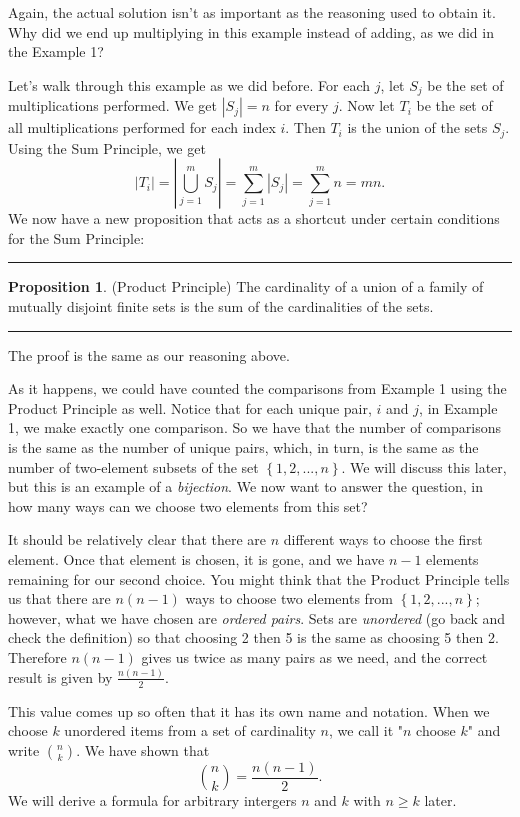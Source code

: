\documentclass[12pt, letterpaper]{article}
\theoremstyle{definition}
\newtheorem{propt}{Proposition}
\newenvironment{prop}[1]{%
    \vspace*{0.2in}
    \linebreak
    \begin{minipage}{\linewidth}
    \rule{\textwidth}{2pt}
        \begin{propt}
}
{%
        \end{propt}
    \rule{\textwidth}{2pt}
    \end{minipage}
    \vspace*{0.2in}
    \linebreak
}
\begin{document}
Again, the actual solution isn't as important as the reasoning used to obtain
it. Why did we end up multiplying in this example instead of adding, as we did
in the Example 1?

Let's walk through this example as we did before. For each $j$, let $S_{j}$
be the set of multiplications performed. We get $|S_{j}| = n$ for every $j$.
Now let $T_{i}$ be the set of all multiplications performed for each index $i$.
Then $T_{i}$ is the union of the sets $S_{j}$.
Using the Sum Principle, we get
\begin{equation*}
    |T_{i}| = \left| \bigcup_{j=1}^{m}S_{j} \right| = \sum_{j=1}^{m}|S_{j}| = \sum_{j=1}^{m}n = mn.
\end{equation*}
We now have a new proposition that acts as a shortcut under certain conditions
for the Sum Principle:
\begin{prop}
    \textbf{(Product Principle)}
    The cardinality of a union of a family of mutually disjoint finite sets is the
    sum of the cardinalities of the sets.
\end{prop}
The proof is the same as our reasoning above.

\clearpage\pagebreak
As it happens, we could have counted the comparisons from Example 1 using the
Product Principle as well. Notice that for each unique pair, $i$ and $j$, in
Example 1, we make exactly one comparison. So we have that the number of
comparisons is the same as the number of unique pairs, which, in turn, is the
same as the number of two-element subsets of the set
$\left\{ 1, 2, ..., n \right\}$. We will discuss this later, but this is an
example of a \emph{bijection}. We now want to answer the question, in how many
ways can we choose two elements from this set?

It should be relatively clear that there are $n$ different ways to choose the
first element. Once that element is chosen, it is gone, and we have $n-1$
elements remaining for our second choice. You might think that the Product
Principle tells us that there are $n(n-1)$ ways to choose two elements from
$\left\{ 1, 2, ..., n \right\}$; however, what we have chosen are
\emph{ordered pairs}. Sets are \emph{unordered} (go back and check the
definition) so that choosing 2 then 5 is the same as choosing 5 then 2.
Therefore $n(n-1)$ gives us twice as many pairs as we need, and the correct
result is given by $\frac{n(n-1)}{2}$.

This value comes up so often that it has its own name and notation.
When we choose $k$ unordered items from a set of cardinality $n$, we call it
"$n$ choose $k$" and write $\binom{n}{k}$. We have shown that
\begin{equation*}
    \binom{n}{k} = \frac{n(n-1)}{2}.
\end{equation*}
We will derive a formula for arbitrary intergers $n$ and $k$ with $n \ge k$
later.
\end{document}
